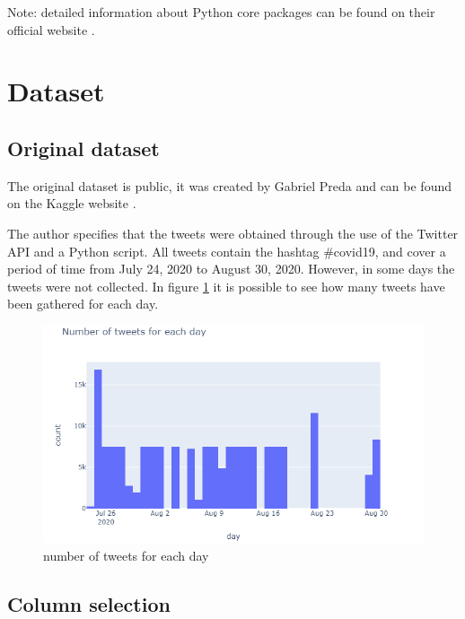 \vspace{4mm}
Note: detailed information about Python core packages can be found on their official website \cite{python_website}. 


\section{Dataset}\label{sect_dataset}

\subsection*{Original dataset}

The original dataset is public, it was created by Gabriel Preda and can be found on the Kaggle website \cite{kaggle_df}.

The author specifies that the tweets were obtained through the use of the Twitter API and a Python script. All tweets contain the hashtag \#covid19, and cover a period of time from July 24, 2020 to August 30, 2020. However, in some days the tweets were not collected. In figure \ref{dates_and_tweets} it is possible to see how many tweets have been gathered for each day. 

\begin{figure}[h]
  \includegraphics[scale=0.44]{dates_and_tweets.png}
  \centering
  \caption{number of tweets for each day}
  \label{dates_and_tweets}
\end{figure}

\subsection*{Column selection}

